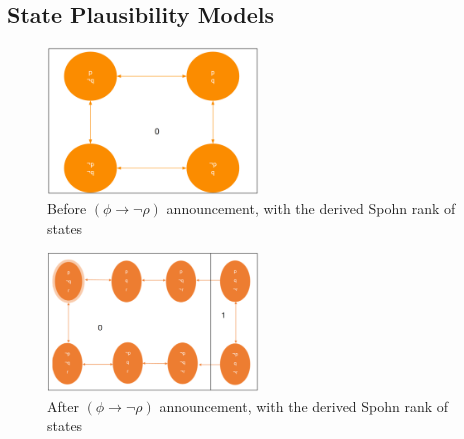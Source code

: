 \documentclass[12pt, titlepage, twoside, a4paper]{report}
\begin{document}
{\subsection{State Plausibility Models}
\quad
\newline
\begin{figure}[h!]
  \centering
  \includegraphics[width=0.5\textwidth]{slide25.eps}
  \caption{Before $(\phi \to \neg \rho)$ announcement, with the derived Spohn rank of states}
\end{figure}
\begin{figure}[h!]
  \centering
  \includegraphics[width=0.5\textwidth]{slide27.eps}
  \caption{After $(\phi \to \neg \rho)$ announcement, with the derived Spohn rank of states}
\end{figure}
\quad
\newline

}
\end{document}
